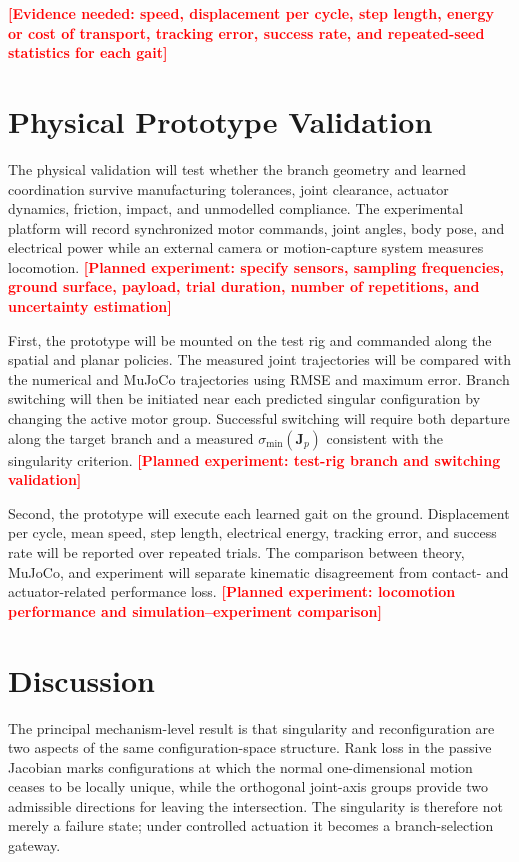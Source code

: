\documentclass[a4paper,fleqn]{cas-sc}
\newcommand{\missing}[1]{\textcolor{red}{\textbf{[#1]}}}
\begin{document}
\missing{Evidence needed: speed, displacement per cycle, step length, energy
or cost of transport, tracking error, success rate, and repeated-seed
statistics for each gait}

\section{Physical Prototype Validation}

The physical validation will test whether the branch geometry and learned
coordination survive manufacturing tolerances, joint clearance, actuator
dynamics, friction, impact, and unmodelled compliance. The experimental
platform will record synchronized motor commands, joint angles, body pose, and
electrical power while an external camera or motion-capture system measures
locomotion.
\missing{Planned experiment: specify sensors, sampling frequencies, ground
surface, payload, trial duration, number of repetitions, and uncertainty
estimation}

First, the prototype will be mounted on the test rig and commanded along the
spatial and planar policies. The measured joint trajectories will be compared
with the numerical and MuJoCo trajectories using RMSE and maximum error.
Branch switching will then be initiated near each predicted singular
configuration by changing the active motor group. Successful switching will
require both departure along the target branch and a measured
\(\sigma_{\min}(\mathbf J_p)\) consistent with the singularity criterion.
\missing{Planned experiment: test-rig branch and switching validation}

Second, the prototype will execute each learned gait on the ground.
Displacement per cycle, mean speed, step length, electrical energy, tracking
error, and success rate will be reported over repeated trials. The comparison
between theory, MuJoCo, and experiment will separate kinematic disagreement
from contact- and actuator-related performance loss.
\missing{Planned experiment: locomotion performance and
simulation--experiment comparison}

\section{Discussion}

The principal mechanism-level result is that singularity and reconfiguration
are two aspects of the same configuration-space structure. Rank loss in the
passive Jacobian marks configurations at which the normal one-dimensional
motion ceases to be locally unique, while the orthogonal joint-axis groups
provide two admissible directions for leaving the intersection. The
singularity is therefore not merely a failure state; under controlled
actuation it becomes a branch-selection gateway.
\end{document}

